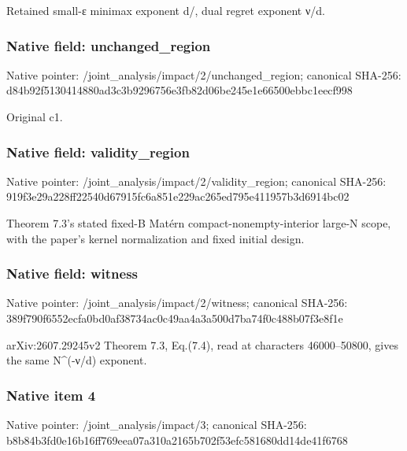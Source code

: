 \documentclass[10pt,a4paper]{article}
\begin{document}
\begingroup\raggedright\sloppy Retained small-{\AtlasUnicodeText ε}\allowbreak{} minimax exponent d/\allowbreak{},\allowbreak{} dual regret exponent {\AtlasUnicodeText ν}\allowbreak{}/\allowbreak{}d.\par\endgroup

\subsubsection{Native field: unchanged\_\allowbreak{}region}
Native pointer: /joint\_\allowbreak{}analysis/impact/2/unchanged\_\allowbreak{}region; canonical SHA-256: d84b92f5130414880ad3c3b9296756e3fb82d06be245e1e66500ebbc1eecf998

\begingroup\raggedright\sloppy Original c1.\par\endgroup

\subsubsection{Native field: validity\_\allowbreak{}region}
Native pointer: /joint\_\allowbreak{}analysis/impact/2/validity\_\allowbreak{}region; canonical SHA-256: 919f3e29a228ff22540d67915fc6a851e229ac265ed795e411957b3d6914bc02

\begingroup\raggedright\sloppy Theorem 7.3's stated fixed-B Mat{\AtlasUnicodeText é}\allowbreak{}rn compact-nonempty-interior large-N scope,\allowbreak{} with the paper's kernel normalization and fixed initial design.\par\endgroup

\subsubsection{Native field: witness}
Native pointer: /joint\_\allowbreak{}analysis/impact/2/witness; canonical SHA-256: 389f790f6552ecfa0bd0af38734ac0c49aa4a3a500d7ba74f0c488b07f3e8f1e

\begingroup\raggedright\sloppy arXiv:\allowbreak{}2607.29245v2 Theorem 7.3,\allowbreak{} Eq.(7.4),\allowbreak{} read at characters 46000{\AtlasUnicodeText –}\allowbreak{}50800,\allowbreak{} gives the same N\textasciicircum{}(-{\AtlasUnicodeText ν}\allowbreak{}/\allowbreak{}d) exponent.\par\endgroup

\subsubsection{Native item 4}
Native pointer: /joint\_\allowbreak{}analysis/impact/3; canonical SHA-256: b8b84b3fd0e16b16ff769eea07a310a2165b702f53efc581680dd14de41f6768
\end{document}
